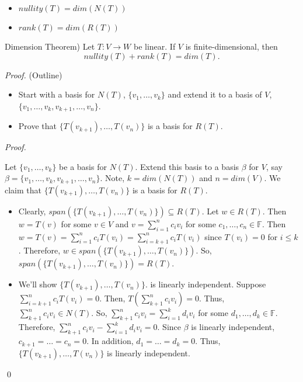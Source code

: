 \documentclass[12pt]{article}
\newenvironment{theorem}[2][Theorem]{\begin{trivlist}
\item[\hskip \labelsep {\bfseries #1}\hskip \labelsep {\bfseries #2.}]}{\end{trivlist}}
\newenvironment{sol}
    {\emph{Proof.}
    }
    {
    \qed
    }
\begin{document}
\begin{itemize}
    \item $nullity(T) = dim(N(T))$
    \item $rank(T) = dim(R(T))$
\end{itemize}

\begin{theorem}{2.3}
(Dimension Theorem) Let $T : V \to W$ be linear. If $V$ is finite-dimensional, then $$nullity(T) + rank(T) = dim(T).$$
\end{theorem}

\textit{Proof.} (Outline)
\begin{itemize}
    \item Start with a basis for $N(T)$, $\{v_1, \dots, v_k\}$ and extend it to a basis of $V$, \newline
    $\{v_1, \dots, v_k, v_{k+1}, \dots, v_n\}$.
    \item Prove that $\{T(v_{k+1}), \dots, T(v_n)\}$ is a basis for $R(T)$.
\end{itemize}

\begin{sol}
Let $\{v_1, \dots, v_k\}$ be a basis for $N(T)$. Extend this basis to a basis $\beta$ for $V$, say $\beta = \{v_1, \dots, v_k, v_{k+1}, \dots, v_n\}$. Note, $k = dim(N(T))$ and $n = dim(V)$. We claim that $\{T(v_{k + 1}), \dots, T(v_n)\}$ is a basis for $R(T)$.
\begin{itemize}
    \item[(1)] Clearly, $span(\{T(v_{k + 1}), \dots, T(v_n)\}) \subseteq R(T)$. Let $w \in R(T)$. Then $w = T(v)$ for some $v \in V$ and $v = \sum_{i = 1}^nc_iv_i$ for some $c_1, \dots, c_n \in \mathbb{F}$. Then $w = T(v) = \sum_{i = 1}^n c_iT(v_i) = \sum_{i = k+1}^nc_iT(v_i)$ since $T(v_i) = 0$ for $i \leq k$. Therefore, $w \in span(\{T(v_{k + 1}), \dots, T(v_n)\})$. So, $span(\{T(v_{k + 1}), \dots, T(v_n)\}) = R(T)$.
    
    \item[(2)] We'll show $\{T(v_{k + 1}), \dots, T(v_n)\}$. is linearly independent. Suppose $\sum_{i = k+1}^nc_iT(v_i) = 0$. Then, $T\left( \sum_{k + 1}^n c_iv_i \right) = 0$. Thus, $\sum_{k + 1}^n c_iv_i \in N(T)$. So, $\sum_{k + 1}^n c_iv_i = \sum_{i = 1}^kd_iv_i$ for some $d_1, \dots, d_k \in \mathbb{F}$. Therefore, $\sum_{k + 1}^n c_iv_i - \sum_{i = 1}^kd_iv_i = 0$. Since $\beta$ is linearly independent, $c_{k + 1} = \dots = c_n = 0$. In addition, $d_1 = \dots = d_k = 0$. Thus, $\{T(v_{k + 1}), \dots, T(v_n)\}$ is linearly independent.
\end{itemize}
\end{sol}
\end{document}
